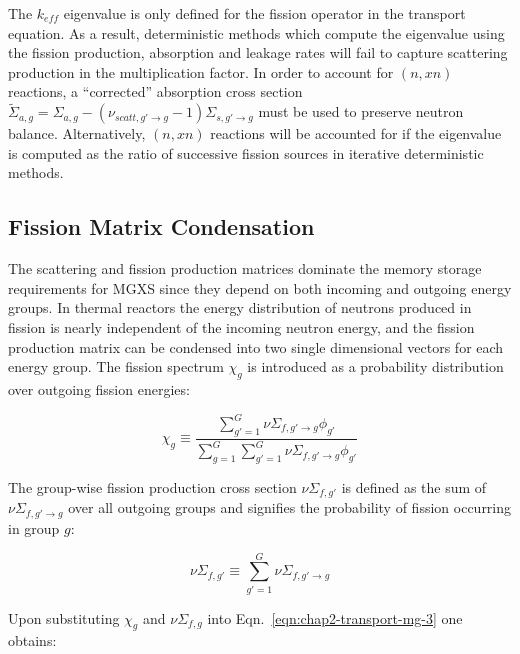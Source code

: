The $k_{eff}$ eigenvalue is only defined for the fission operator in the transport equation. As a result, deterministic methods which compute the eigenvalue using the fission production, absorption and leakage rates will fail to capture scattering production in the multiplication factor. In order to account for $(n,xn)$ reactions, a ``corrected'' absorption cross section $\tilde{\Sigma}_{a,g} = \Sigma_{a,g} - (\nu_{scatt,g' \rightarrow g} - 1)\Sigma_{s,g' \rightarrow g}$ must be used to preserve neutron balance. Alternatively, $(n,xn)$ reactions will be accounted for if the eigenvalue is computed as the ratio of successive fission sources in iterative deterministic methods.


\subsection{Fission Matrix Condensation}
\label{sec:chap2-fiss-mat}

The scattering and fission production matrices dominate the memory storage requirements for \ac{MGXS} since they depend on both incoming and outgoing energy groups. In thermal reactors the energy distribution of neutrons produced in fission is nearly independent of the incoming neutron energy, and the fission production matrix can be condensed into two single dimensional vectors for each energy group. The fission spectrum $\chi_{g}$ is introduced as a probability distribution over outgoing fission energies:

\begin{dmath}
\label{eqn:chap2-chi}
\chi_{g} \equiv \frac{\displaystyle\sum\limits_{g'=1}^{G}\nu\Sigma_{f,g'\rightarrow g}\phi_{g'}}{\displaystyle\sum\limits_{g=1}^{G}\displaystyle\sum\limits_{g'=1}^{G}\nu\Sigma_{f,g'\rightarrow g}\phi_{g'}}
\end{dmath}

The group-wise fission production cross section $\nu\Sigma_{f,g'}$ is defined as the sum of $\nu\Sigma_{f,g'\rightarrow g}$ over all outgoing groups and signifies the probability of fission occurring in group $g$:

\begin{dmath}
\label{eqn:chap2-nusifg}
\nu\Sigma_{f,g'} \equiv \displaystyle\sum\limits_{g'=1}^{G}\nu\Sigma_{f,g'\rightarrow g}
\end{dmath}

\noindent Upon substituting $\chi_{g}$ and $\nu\Sigma_{f,g}$ into Eqn.~\ref{eqn:chap2-transport-mg-3} one obtains:

